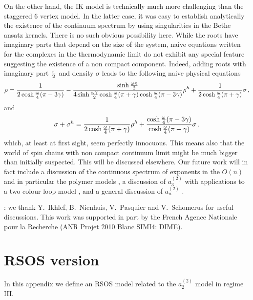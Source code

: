 \documentclass[11pt]{article}
\begin{document}
On the other hand, the IK model is technically much more challenging than the staggered 6 vertex model. In the latter case, it was easy to establish analytically the existence of the continuum spectrum by using singularities in the Bethe ansatz kernels. There is no such obvious possibility here. While the roots have imaginary parts that depend on the size of the system, naive equations written for the complexes in the thermodynamic limit do not exhibit any special feature suggesting the existence of a non compact component. Indeed, 
adding roots with imaginary part ${\pi\over 2}$ and density $\sigma$ leads to the following naive physical equations
%
\begin{equation}
\rho={1\over 2\cosh {\omega\over 4}(\pi-3\gamma)}-{\sinh {\omega\pi\over 2}\over 
4\sinh {\omega\gamma\over 2}\cosh {\omega\over 4}(\pi+\gamma)\cosh {\omega\over 4}(\pi-3\gamma)}\rho^h+
{1\over 2\cosh{\omega\over 4}(\pi+\gamma)}\sigma \,,
\end{equation}
%
and 
%
\begin{equation}
\sigma+\sigma^h= {1\over 2\cosh{\omega\over 4}(\pi+\gamma)}\rho^h+{\cosh {\omega\over 4}(\pi-3\gamma)\over \cosh{\omega\over4}(\pi+\gamma)}\sigma \,.
\end{equation}
%
which, at least at first sight, seem perfectly innocuous. This means also that the world of spin chains with non compact continuum limit might be much bigger than initially suspected. This will be discussed elsewhere. Our future work will in fact include a discussion of the continuous spectrum of exponents in the $O(n)$ and in particular the polymer models \cite{VJS2}, a discussion of $a_3^{(2)}$ with applications to a two colour loop model \cite{VJS3}, and a general discussion of $a_n^{(2)}$ \cite{VJS4}. 




\bigskip

: we thank Y.~Ikhlef, B.~Nienhuis, V.~Pasquier and V.~Schomerus for useful discussions. This work was supported in part by the French Agence Nationale pour la Recherche (ANR Projet 2010 Blanc SIMI4: DIME). 



\appendix

\section{RSOS version}
\label{app:A}

In this appendix we define an RSOS model related to the $a_{2}^{(2)}$ model in regime III. 
\end{document}
